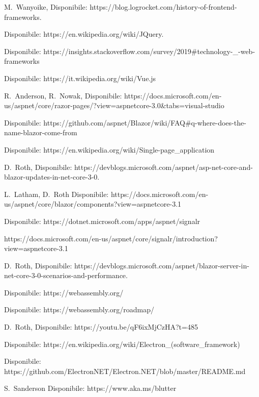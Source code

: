 \begin{thebibliography}{999}

M.~Wanyoike,
Disponibile: https://blog.logrocket.com/history-of-frontend-frameworks.

Disponibile: https://en.wikipedia.org/wiki/JQuery.

Disponibile:
https://insights.stackoverflow.com/survey/2019\#technology-\_-web-frameworks

Disponibile: https://it.wikipedia.org/wiki/Vue.js

R.~Anderson,
R.~Nowak,
Disponibile: https://docs.microsoft.com/en-us/aspnet/core/razor-pages/?view=aspnetcore-3.0\&tabs=visual-studio

Disponibile: https://github.com/aspnet/Blazor/wiki/FAQ\#q-where-does-the-name-blazor-come-from

Disponibile: https://en.wikipedia.org/wiki/Single-page\_application

D.~Roth,
Disponibile: https://devblogs.microsoft.com/aspnet/asp-net-core-and-blazor-updates-in-net-core-3-0.

L.~Latham, D.~Roth
Disponibile: https://docs.microsoft.com/en-us/aspnet/core/blazor/components?view=aspnetcore-3.1

Disponibile: https://dotnet.microsoft.com/apps/aspnet/signalr

https://docs.microsoft.com/en-us/aspnet/core/signalr/introduction?view=aspnetcore-3.1

D.~Roth,
Disponibile: https://devblogs.microsoft.com/aspnet/blazor-server-in-net-core-3-0-scenarios-and-performance.

Disponibile: https://webassembly.org/

Disponibile: https://webassembly.org/roadmap/

D.~Roth,
Disponibile:
https://youtu.be/qF6ixMjCzHA?t=485

Disponibile:
https://en.wikipedia.org/wiki/Electron\_(software\_framework)

Disponibile: https://github.com/ElectronNET/Electron.NET/blob/master/README.md

S.~Sanderson
Disponibile: https://www.aka.ms/blutter


\end{thebibliography}
